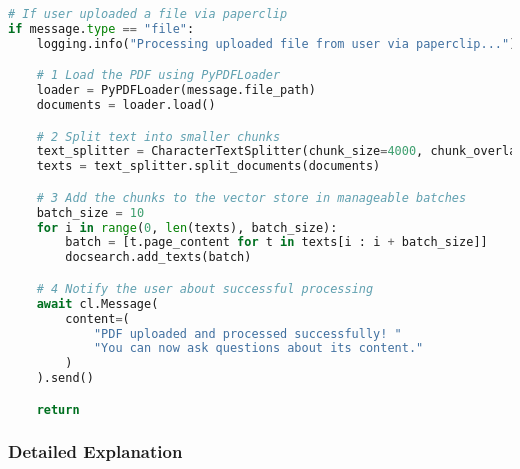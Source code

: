 \begin{lstlisting}[language=Python, caption={PDF Processing and Chunking}, basicstyle=\small\ttfamily]
# If user uploaded a file via paperclip
if message.type == "file":
    logging.info("Processing uploaded file from user via paperclip...")

    # 1 Load the PDF using PyPDFLoader
    loader = PyPDFLoader(message.file_path)
    documents = loader.load()

    # 2 Split text into smaller chunks
    text_splitter = CharacterTextSplitter(chunk_size=4000, chunk_overlap=500)
    texts = text_splitter.split_documents(documents)

    # 3 Add the chunks to the vector store in manageable batches
    batch_size = 10
    for i in range(0, len(texts), batch_size):
        batch = [t.page_content for t in texts[i : i + batch_size]]
        docsearch.add_texts(batch)

    # 4 Notify the user about successful processing
    await cl.Message(
        content=(
            "PDF uploaded and processed successfully! "
            "You can now ask questions about its content."
        )
    ).send()

    return
\end{lstlisting}

\subsubsection*{Detailed Explanation}

